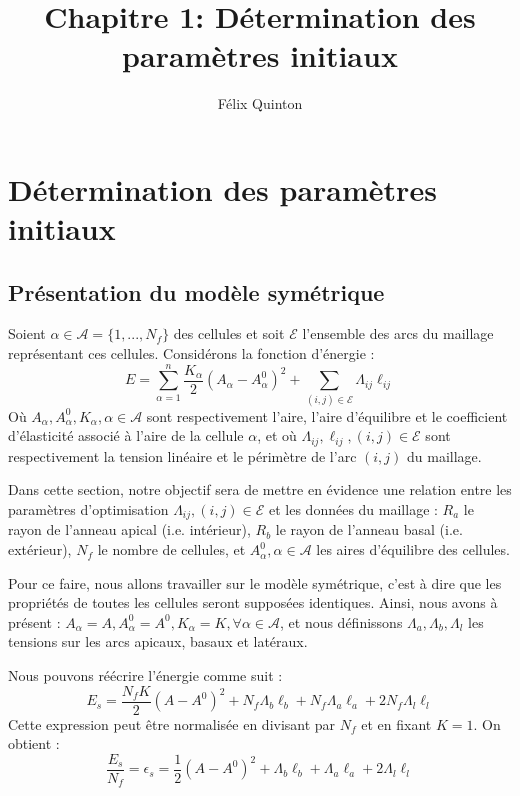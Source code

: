 \documentclass[11pt,a4paper]{article}
\title{Chapitre 1: Détermination des paramètres initiaux}
\author{Félix Quinton}
\begin{document}
\maketitle
\thispagestyle{empty}

\section{Détermination des paramètres initiaux}

\subsection{Présentation du modèle symétrique}

Soient $\alpha \in \mathcal{A} = \{1, ..., N_f\}$ des cellules et soit $\mathcal{E}$ l'ensemble des arcs du maillage représentant ces cellules. Considérons la fonction d'énergie :
$$
E = \sum_{\alpha = 1}^n\frac{K_\alpha}{2}(A_\alpha-A_\alpha^0)^2 + \sum_{(i,j) \in \mathcal{E}}\Lambda_{ij}\ell_{ij}
$$
Où $A_\alpha, A_\alpha^0, K_\alpha, \alpha \in \mathcal{A}$ sont respectivement l'aire, l'aire d'équilibre et le coefficient d'élasticité associé à l'aire de la cellule $\alpha$, et où $\Lambda_{ij}, \ell_{ij}, (i,j) \in \mathcal{E}$ sont respectivement la tension linéaire et le périmètre de l'arc $(i,j)$ du maillage.

Dans cette section, notre objectif sera de mettre en évidence une relation entre les paramètres d'optimisation $\Lambda_{ij}, (i,j) \in \mathcal{E}$ et les données du maillage : $R_a$ le rayon de l'anneau apical (i.e. intérieur), $R_b$ le rayon de l'anneau basal (i.e. extérieur), $N_f$ le nombre de cellules, et $A_\alpha^0, \alpha \in \mathcal{A}$ les aires d'équilibre des cellules.

Pour ce faire, nous allons travailler sur le modèle symétrique, c'est à dire que les propriétés de toutes les cellules seront supposées identiques. Ainsi, nous avons à présent : $A_\alpha = A, A_\alpha^0 = A^0, K_\alpha = K, \forall \alpha \in \mathcal{A}$, et nous définissons $\Lambda_a, \Lambda_b, \Lambda_l$ les tensions sur les arcs apicaux, basaux et latéraux.

Nous pouvons réécrire l'énergie comme suit :
$$ 
E_s = \frac{N_f K}{2}(A-A^0)^2 + N_f\Lambda_b\ell_b + N_f\Lambda_a\ell_a + 2N_f\Lambda_l\ell_l
$$
Cette expression peut être normalisée en divisant par $N_f$ et en fixant $K=1$. On obtient :
$$
\frac{E_s}{N_f} = \epsilon_s = \frac{1}{2}(A - A^0)^2 + \Lambda_b\ell_b + \Lambda_a\ell_a + 2\Lambda_l\ell_l
$$
\end{document}
